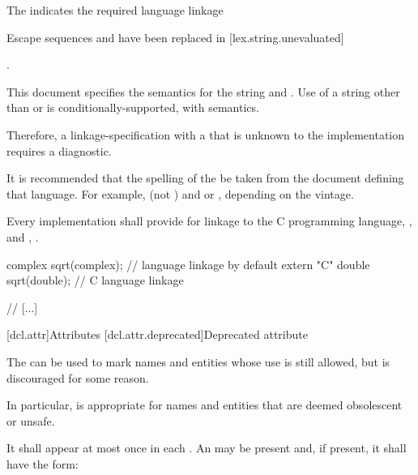 \documentclass{wg21}
\begin{document}
The  indicates the required language linkage
\begin{addedblock}
\begin{note}
Escape sequences and  have been replaced in [lex.string.unevaluated]
\end{note}
\end{addedblock}
.

This document specifies the semantics for the
string  and . Use of a
string other than  or  is
conditionally-supported, with  semantics.
\begin{note}
    Therefore, a linkage-specification with a  that
    is unknown to the implementation requires a diagnostic.
\end{note}
\begin{note}
    It is recommended that the spelling of the  be
    taken from the document defining that language. For example, 
    (not ) and  or , depending on
    the vintage.
\end{note}


\pnum
{}%
Every implementation shall provide for linkage to the C programming language,
%
, and \Cpp{}, .
\begin{example}
    \begin{codeblock}
        complex sqrt(complex);          // \Cpp{} language linkage by default
        extern "C" {
            double sqrt(double);          // C language linkage
        }
    \end{codeblock}
\end{example}

// [...]

[dcl.attr]{Attributes}%
[dcl.attr.deprecated]{Deprecated attribute}%

\pnum
The   can be used to mark names and entities
whose use is still allowed, but is discouraged for some reason.
\begin{note}
    In particular,
     is appropriate for names and entities that are deemed obsolescent or
    unsafe.
\end{note}
It shall appear at most once in each . An
 may be present and, if present, it shall have the form:
\end{document}
